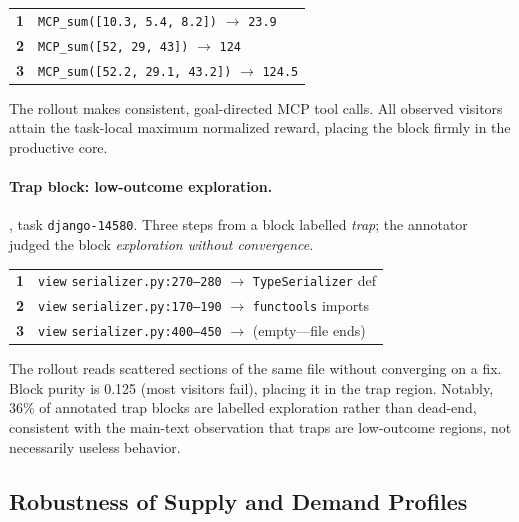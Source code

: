 \smallskip\noindent\small
\begin{tabularx}{\linewidth}{@{}l@{\;\;}X@{}}
\textbf{1} & \texttt{MCP\_sum([10.3, 5.4, 8.2])} $\to$ \texttt{23.9} \\[2pt]
\textbf{2} & \texttt{MCP\_sum([52, 29, 43])} $\to$ \texttt{124} \\[2pt]
\textbf{3} & \texttt{MCP\_sum([52.2, 29.1, 43.2])} $\to$ \texttt{124.5} \\
\end{tabularx}
\normalsize

\smallskip\noindent
The rollout makes consistent, goal-directed MCP tool calls.
All observed visitors attain the task-local maximum normalized reward, placing the block firmly in the productive core.

\paragraph{Trap block: low-outcome exploration.}
\swe{}, task \texttt{django-14580}.
Three steps from a block labelled \emph{trap}; the annotator judged the block \emph{exploration without convergence}.

\smallskip\noindent\small
\begin{tabularx}{\linewidth}{@{}l@{\;\;}X@{}}
\textbf{1} & \texttt{view} \texttt{serializer.py:270--280} $\to$ \texttt{TypeSerializer} def \\[2pt]
\textbf{2} & \texttt{view} \texttt{serializer.py:170--190} $\to$ \texttt{functools} imports \\[2pt]
\textbf{3} & \texttt{view} \texttt{serializer.py:400--450} $\to$ (empty---file ends) \\
\end{tabularx}
\normalsize

\smallskip\noindent
The rollout reads scattered sections of the same file without converging on a fix.
Block purity is 0.125 (most visitors fail), placing it in the trap region.
Notably, 36\% of annotated trap blocks are labelled exploration rather than dead-end, consistent with the main-text observation that traps are low-outcome regions, not necessarily useless behavior.


\subsection{Robustness of Supply and Demand Profiles}
\label{app:sensitivity}

